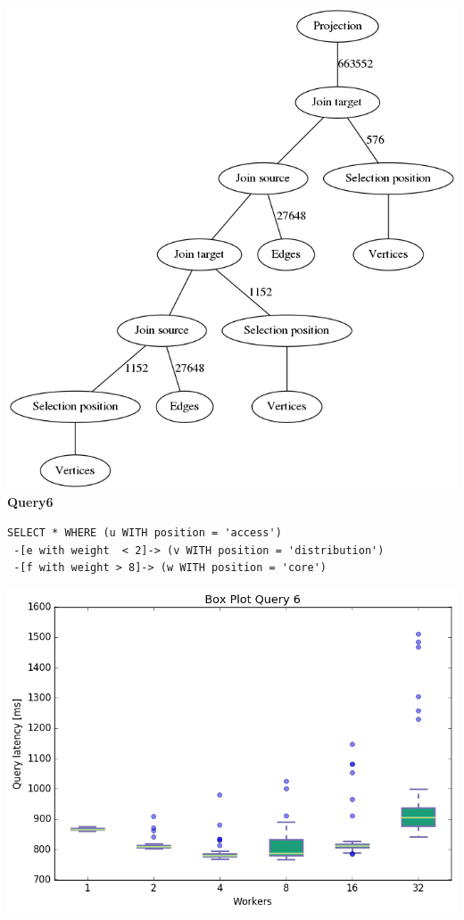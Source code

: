 \documentclass[11pt,singlecolumn]{scrartcl}
\begin{document}
\includegraphics[width=1\textwidth]{graph5}
\clearpage
\textbf{Query6}\\
\begin{verbatim}
SELECT * WHERE (u WITH position = 'access')
 -[e with weight  < 2]-> (v WITH position = 'distribution')
 -[f with weight > 8]-> (w WITH position = 'core')\end{verbatim}
\includegraphics[width=1\textwidth]{box/q6}
\end{document}
